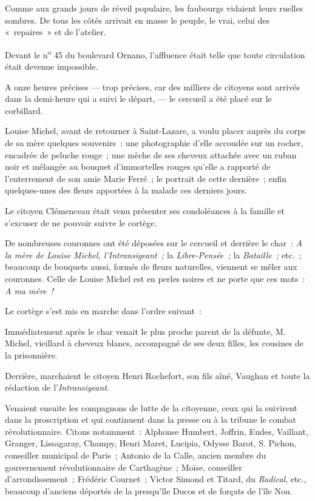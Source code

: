 \documentclass[french,twoside]{book} %
\def\mednobreak{\ifdim\lastskip<\medskipamount
  \removelastskip\nopagebreak\medskip\fi}
\newcommand{\labelblock}[1]{\medbreak{\noindent\color{rubric}\bfseries #1}\par\mednobreak}
\newenvironment{quoteblock}%
  {\begin{quoting}}
  {\end{quoting}}
\newenvironment{quotebar}{%
    \def\FrameCommand{{\color{rubric!10!}\vrule width 0.5em} \hspace{0.9em}}%
    \def\OuterFrameSep{\itemsep} %
    \MakeFramed {\advance\hsize-\width \FrameRestore}
  }%
  {%
    \endMakeFramed
  }
\renewenvironment{quoteblock}%
  {%
    \savenotes
    \setstretch{0.9}
    \normalfont
    \begin{quotebar}
  }
  {%
    \end{quotebar}
    \spewnotes
  }
\begin{document}
\begin{quoteblock}
 
\labelblock{A LA MAISON MORTUAIRE}

 \noindent Comme aux grands jours de réveil populaire, les faubourgs vidaient leurs ruelles sombres. De tous les côtés arrivait en masse le peuple, le vrai, celui des « repaires » et de l’atelier.\par
   Devant le n\textsuperscript{o} 45 du boulevard Ornano, l’affluence était telle que toute circulation était devenue impossible.\par
 A onze heures précises — trop précises, car des milliers de citoyens sont arrivés dans la demi-heure qui a suivi le départ, — le cercueil a été placé sur le corbillard.\par
 Louise Michel, avant de retourner à Saint-Lazare, a voulu placer auprès du corps de sa mère quelques souvenirs : une photographie d’elle accoudée sur un rocher, encadrée de peluche rouge ; une mèche de ses cheveux attachée avec un ruban noir et mélangée au bouquet d’immortelles rouges qu’elle a rapporté de l’enterrement de son amie Marie Ferré ; le portrait de cette dernière ; enfin quelques-unes des fleurs apportées à la malade ces derniers jours.\par
 Le citoyen Clémenceau était venu présenter ses condoléances à la famille et s’excuser de ne pouvoir suivre le cortège.\par
 De nombreuses couronnes ont été déposées sur le cercueil et derrière le char : \emph{A la mère de Louise Michel, l’Intransigeant ;} la \emph{Libre-Pensée ;} la \emph{Bataille ;} etc. ; beaucoup de bouquets aussi, formés de fleurs naturelles, viennent se mêler aux couronnes. Celle de Louise Michel est en perles noires et ne porte que ces mots : \emph{A ma mére !}\par
 Le cortège s’est mis en marche dans l’ordre suivant :\par
 Immédiatement après le char venait le plus proche parent de la défunte, M. Michel, vieillard à cheveux blancs, accompagné de ses deux filles, les cousines de la prisonnière.\par
 Derrière, marchaient le citoyen Henri Rochefort, son fils aîné, Vaughan et toute la rédaction de l’\emph{Intransigeant}.\par
 Venaient ensuite les compagnons de lutte de la citoyenne, ceux qui la suivirent dans la proscription et qui continuent dans la presse ou à la tribune le combat révolutionnaire. Citons notamment : Alphonse Humbert, Joffrin, Eudes, Vaillant, Granger, Lissagaray, Champy, Henri Maret, Lucipia, Odysse Barot, S. Pichon, conseiller municipal de Paris ; Antonio de la Calle, ancien membre du gouvernement révolutionnaire de Carthagène ; Moïse, conseiller d’arrondissement ; Frédéric Cournet ; Victor Simond et Titard, du \emph{Radical}, etc., beaucoup d’anciens déportés de la presqu’île Ducos et de forçats de l’île Nou.\par

\end{quoteblock}
\end{document}
